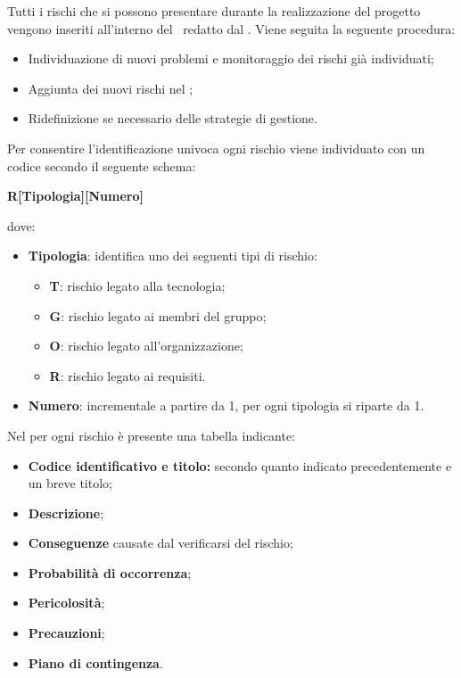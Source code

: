 \label{GestioneRischi}Tutti i rischi che si possono presentare durante la realizzazione del progetto vengono inseriti all'interno del \PdPv\ redatto dal \Responsabile.
Viene seguita la seguente procedura:
\begin{itemize}
	\item Individuazione di nuovi problemi e monitoraggio dei rischi già individuati;
	\item Aggiunta dei nuovi rischi nel {\PdP};
	\item Ridefinizione se necessario delle strategie di gestione.
\end{itemize}
Per consentire l'identificazione univoca ogni rischio viene individuato con un codice secondo il seguente schema:
\begin{center}
	\textbf{R[Tipologia][Numero]}
\end{center}
dove: 
\begin{itemize}
	\item \textbf{Tipologia}: identifica uno dei seguenti tipi di rischio:
		\begin{itemize}
			\item \textbf{T}: rischio legato alla tecnologia;
			\item \textbf{G}: rischio legato ai membri del gruppo;
			\item \textbf{O}: rischio legato all'organizzazione;
			\item \textbf{R}: rischio legato ai requisiti.
		\end{itemize}
	\item \textbf{Numero}: incrementale a partire da 1, per ogni tipologia si riparte da 1.
\end{itemize}
Nel  per ogni rischio è presente una tabella indicante:
\begin{itemize}
	\item \textbf{Codice identificativo e titolo:} secondo quanto indicato precedentemente e un breve titolo;
	\item \textbf{Descrizione};
	\item \textbf{Conseguenze} causate dal verificarsi del rischio;
	\item \textbf{Probabilità di occorrenza};
	\item \textbf{Pericolosità};
	\item \textbf{Precauzioni};
	\item \textbf{Piano di contingenza}.
\end{itemize}

